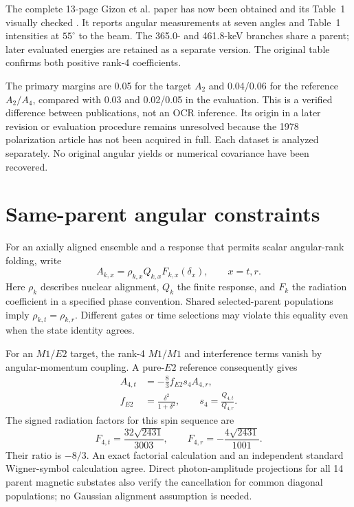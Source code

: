 \documentclass[pdflatex,iicol,sn-mathphys-num]{sn-jnl}
\begin{document}
The complete 13-page Gizon et al. paper has now been obtained and its Table~1 visually checked \cite{Gizon1977}. It reports angular measurements at seven angles and Table~1 intensities at \(55^\circ\) to the beam. The 365.0- and 461.8-keV branches share a parent; later evaluated energies are retained as a separate version. The original table confirms both positive rank-4 coefficients.

The primary margins are 0.05 for the target \(A_2\) and 0.04/0.06 for the reference \(A_2/A_4\), compared with 0.03 and 0.02/0.05 in the evaluation. This is a verified difference between publications, not an OCR inference. Its origin in a later revision or evaluation procedure remains unresolved because the 1978 polarization article has not been acquired in full. Each dataset is analyzed separately. No original angular yields or numerical covariance have been recovered.

\section{Same-parent angular constraints}

For an axially aligned ensemble and a response that permits scalar angular-rank folding, write
\begin{equation}
 A_{k,x}=\rho_{k,x}Q_{k,x}F_{k,x}(\delta_x),\qquad x=t,r.
\end{equation}
Here \(\rho_k\) describes nuclear alignment, \(Q_k\) the finite response, and \(F_k\) the radiation coefficient in a specified phase convention. Shared selected-parent populations imply \(\rho_{k,t}=\rho_{k,r}\). Different gates or time selections may violate this equality even when the state identity agrees.

For an \(M1/E2\) target, the rank-4 \(M1/M1\) and interference terms vanish by angular-momentum coupling. A pure-\(E2\) reference consequently gives
\begin{equation}
 \begin{aligned}
 A_{4,t}&=-\frac83 f_{E2}s_4 A_{4,r},\\
 f_{E2}&=\frac{\delta^2}{1+\delta^2},\qquad
 s_4=\frac{Q_{4,t}}{Q_{4,r}}.
 \end{aligned}
 \label{eq:rank4}
\end{equation}
The signed radiation factors for this spin sequence are
\begin{equation}
 F_{4,t}=\frac{32\sqrt{2431}}{3003},\qquad
 F_{4,r}=-\frac{4\sqrt{2431}}{1001}.
\end{equation}
Their ratio is \(-8/3\). An exact factorial calculation and an independent standard Wigner-symbol calculation agree. Direct photon-amplitude projections for all 14 parent magnetic substates also verify the cancellation for common diagonal populations; no Gaussian alignment assumption is needed.
\end{document}
